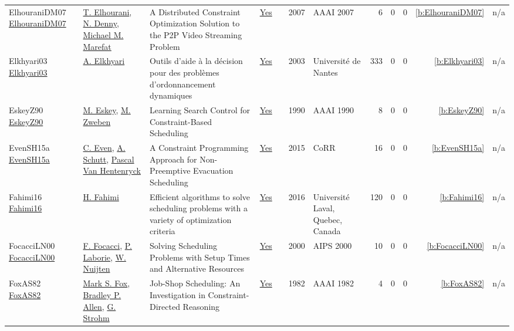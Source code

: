 {\begin{longtable}{>{\raggedright\arraybackslash}p{3cm}>{\raggedright\arraybackslash}p{6cm}>{\raggedright\arraybackslash}p{6.5cm}rrrp{2.5cm}rrrrr}
ElhouraniDM07 \href{http://www.aaai.org/Library/AAAI/2007/aaai07-213.php}{ElhouraniDM07} & \hyperref[auth:a1367]{T. Elhourani}, \hyperref[auth:a1368]{N. Denny}, \hyperref[auth:a1369]{Michael M. Marefat} & A Distributed Constraint Optimization Solution to the {P2P} Video Streaming Problem & \href{../works/ElhouraniDM07.pdf}{Yes} & \cite{ElhouraniDM07} & 2007 & AAAI 2007 & 6 & 0 & 0 & \ref{b:ElhouraniDM07} & n/a\\
Elkhyari03 \href{https://theses.hal.science/tel-00008377}{Elkhyari03} & \hyperref[auth:a294]{A. Elkhyari} & {Outils d'aide {\`a} la d{\'e}cision pour des probl{\`e}mes d'ordonnancement dynamiques} & \href{../works/Elkhyari03.pdf}{Yes} & \cite{Elkhyari03} & 2003 & {Universit{\'e} de Nantes} & 333 & 0 & 0 & \ref{b:Elkhyari03} & n/a\\
EskeyZ90 \href{http://www.aaai.org/Library/AAAI/1990/aaai90-136.php}{EskeyZ90} & \hyperref[auth:a1297]{M. Eskey}, \hyperref[auth:a1298]{M. Zweben} & Learning Search Control for Constraint-Based Scheduling & \href{../works/EskeyZ90.pdf}{Yes} & \cite{EskeyZ90} & 1990 & AAAI 1990 & 8 & 0 & 0 & \ref{b:EskeyZ90} & n/a\\
EvenSH15a \href{http://arxiv.org/abs/1505.02487}{EvenSH15a} & \hyperref[auth:a219]{C. Even}, \hyperref[auth:a125]{A. Schutt}, \hyperref[auth:a149]{Pascal Van Hentenryck} & A Constraint Programming Approach for Non-Preemptive Evacuation Scheduling & \href{../works/EvenSH15a.pdf}{Yes} & \cite{EvenSH15a} & 2015 & CoRR & 16 & 0 & 0 & \ref{b:EvenSH15a} & n/a\\
Fahimi16 \href{http://cp2014.a4cp.org/sites/default/files/hamed_fahimi_-_efficient_algorithms_to_solve_scheduling_problems_with_a_variety_of_optimization_criteria.pdf}{Fahimi16} & \hyperref[auth:a122]{H. Fahimi} & Efficient algorithms to solve scheduling problems with a variety of optimization criteria & \href{../works/Fahimi16.pdf}{Yes} & \cite{Fahimi16} & 2016 & Universit{\'{e}} Laval, Quebec, Canada & 120 & 0 & 0 & \ref{b:Fahimi16} & n/a\\
FocacciLN00 \href{http://www.aaai.org/Library/AIPS/2000/aips00-010.php}{FocacciLN00} & \hyperref[auth:a782]{F. Focacci}, \hyperref[auth:a118]{P. Laborie}, \hyperref[auth:a662]{W. Nuijten} & Solving Scheduling Problems with Setup Times and Alternative Resources & \href{../works/FocacciLN00.pdf}{Yes} & \cite{FocacciLN00} & 2000 & AIPS 2000 & 10 & 0 & 0 & \ref{b:FocacciLN00} & n/a\\
FoxAS82 \href{http://www.aaai.org/Library/AAAI/1982/aaai82-037.php}{FoxAS82} & \hyperref[auth:a304]{Mark S. Fox}, \hyperref[auth:a1018]{Bradley P. Allen}, \hyperref[auth:a1019]{G. Strohm} & Job-Shop Scheduling: An Investigation in Constraint-Directed Reasoning & \href{../works/FoxAS82.pdf}{Yes} & \cite{FoxAS82} & 1982 & AAAI 1982 & 4 & 0 & 0 & \ref{b:FoxAS82} & n/a\\

\end{longtable}}
